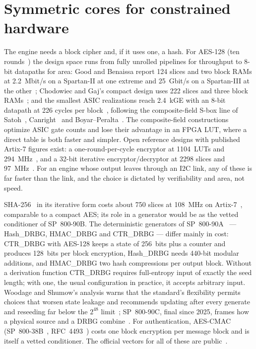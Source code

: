 \section{Symmetric cores for constrained hardware}
\label{sec:soa_cores}

The engine needs a block cipher and, if it uses one, a hash. For AES-128
(ten rounds~\cite{nist_2023_fips197}) the design space runs from
fully unrolled pipelines for throughput to 8-bit datapaths for area:
Good and Benaissa report 124 slices and two block RAMs at 2.2~Mbit/s on
a Spartan-II at one extreme and 25~Gbit/s on a Spartan-III at the
other~\cite{good_2005_fastest}; Chodowiec and Gaj's compact design uses 222
slices and three block RAMs~\cite{chodowiec_2003_compact}; and the
smallest ASIC realizations reach 2.4~kGE with an 8-bit datapath at 226
cycles per block~\cite{moradi2011pushing}, following the composite-field
S-box line of Satoh~\cite{satoh_2001_compact}, Canright~\cite{canright_2005_compact}
and Boyar--Peralta~\cite{boyar_2010_minimization}. The composite-field
constructions optimize ASIC gate counts and lose their advantage in an
FPGA LUT, where a direct table is both faster and simpler. Open
reference designs with published Artix-7 figures exist: a one-round-per-cycle
encryptor at 1104~LUTs and 294~MHz~\cite{hadipour_aesvhdl}, and a 32-bit
iterative encryptor/decryptor at 2298 slices and 97~MHz~\cite{strombergson_aes}.
For an engine whose output leaves through an I2C link, any of these is
far faster than the link, and the choice is dictated by verifiability and
area, not speed.

SHA-256~\cite{nist_2015_fips1804} in its iterative form costs about 750
slices at 108~MHz on Artix-7~\cite{strombergson_sha256}, comparable to a
compact AES; its role in a generator would be as the vetted conditioner of
SP~800-90B. The deterministic generators of
SP~800-90A~\cite{barker_2015_sp80090ar1} --- Hash\_DRBG, HMAC\_DRBG and
CTR\_DRBG --- differ mainly in cost: CTR\_DRBG with AES-128 keeps a state
of 256~bits plus a counter and produces 128~bits per block encryption,
Hash\_DRBG needs 440-bit modular additions, and HMAC\_DRBG two hash
compressions per output block. Without a derivation function CTR\_DRBG
requires full-entropy input of exactly the seed length; with one, the
usual configuration in practice, it accepts arbitrary input. Woodage and
Shumow's analysis warns that the standard's flexibility permits choices
that worsen state leakage and recommends updating after every generate
and reseeding far below the $2^{48}$ limit~\cite{woodage_2019_analysis};
SP~800-90C, final since 2025, frames how a physical source and a DRBG
combine~\cite{barker_2025_sp80090c}. For authentication, AES-CMAC
(SP~800-38B~\cite{nist_2016_sp80038b}, RFC~4493~\cite{song_2006_rfc4493})
costs one block encryption per message block and is itself a vetted
conditioner. The official vectors for all of these are
public~\cite{nist_cavp_blockciphers, nist_cavp_modes, nist_cavp_drbg,
nist_acvp_server}.

